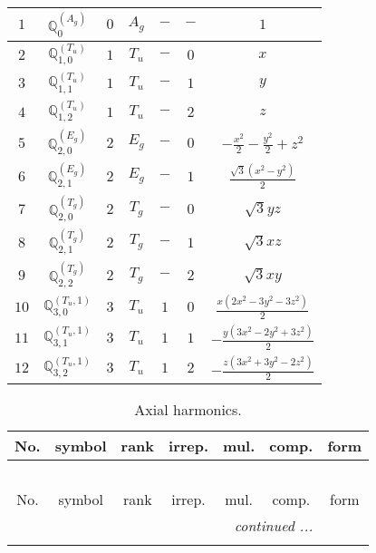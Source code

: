 \documentclass[fleqn,10pt,landscape]{article}
\begin{document}
\begin{itemize}
\begin{center}
\begin{longtable}{ccccccc}
$ 1 $ & $ \mathbb{Q}_{0}^{(A_{g})} $ & $ 0 $ & $ A_{g} $ & $ - $ & $ - $ & $ 1 $ \\ \hline
$ 2 $ & $ \mathbb{Q}_{1,0}^{(T_{u})} $ & $ 1 $ & $ T_{u} $ & $ - $ & $ 0 $ & $ x $ \\
$ 3 $ & $ \mathbb{Q}_{1,1}^{(T_{u})} $ & $ 1 $ & $ T_{u} $ & $ - $ & $ 1 $ & $ y $ \\
$ 4 $ & $ \mathbb{Q}_{1,2}^{(T_{u})} $ & $ 1 $ & $ T_{u} $ & $ - $ & $ 2 $ & $ z $ \\ \hline
$ 5 $ & $ \mathbb{Q}_{2,0}^{(E_{g})} $ & $ 2 $ & $ E_{g} $ & $ - $ & $ 0 $ & $ - \frac{x^{2}}{2} - \frac{y^{2}}{2} + z^{2} $ \\
$ 6 $ & $ \mathbb{Q}_{2,1}^{(E_{g})} $ & $ 2 $ & $ E_{g} $ & $ - $ & $ 1 $ & $ \frac{\sqrt{3} \left(x^{2} - y^{2}\right)}{2} $ \\
$ 7 $ & $ \mathbb{Q}_{2,0}^{(T_{g})} $ & $ 2 $ & $ T_{g} $ & $ - $ & $ 0 $ & $ \sqrt{3} y z $ \\
$ 8 $ & $ \mathbb{Q}_{2,1}^{(T_{g})} $ & $ 2 $ & $ T_{g} $ & $ - $ & $ 1 $ & $ \sqrt{3} x z $ \\
$ 9 $ & $ \mathbb{Q}_{2,2}^{(T_{g})} $ & $ 2 $ & $ T_{g} $ & $ - $ & $ 2 $ & $ \sqrt{3} x y $ \\ \hline
$ 10 $ & $ \mathbb{Q}_{3,0}^{(T_{u},1)} $ & $ 3 $ & $ T_{u} $ & $ 1 $ & $ 0 $ & $ \frac{x \left(2 x^{2} - 3 y^{2} - 3 z^{2}\right)}{2} $ \\
$ 11 $ & $ \mathbb{Q}_{3,1}^{(T_{u},1)} $ & $ 3 $ & $ T_{u} $ & $ 1 $ & $ 1 $ & $ - \frac{y \left(3 x^{2} - 2 y^{2} + 3 z^{2}\right)}{2} $ \\
$ 12 $ & $ \mathbb{Q}_{3,2}^{(T_{u},1)} $ & $ 3 $ & $ T_{u} $ & $ 1 $ & $ 2 $ & $ - \frac{z \left(3 x^{2} + 3 y^{2} - 2 z^{2}\right)}{2} $ \\
\end{longtable}
\end{center}
\begin{center}
\renewcommand{\arraystretch}{1.3}
\begin{longtable}{ccccccc}
\caption{Axial harmonics.}
 \\
 \hline \hline
No. & symbol & rank & irrep. & mul. & comp. & form \\ \hline \endfirsthead

\multicolumn{6}{l}{\tablename\ \thetable{}} \\
 \hline \hline
No. & symbol & rank & irrep. & mul. & comp. & form \\ \hline \endhead

 \hline \hline
\multicolumn{6}{r}{\footnotesize\it continued ...} \\ \endfoot


\end{longtable}
\end{center}
\end{itemize}
\end{document}
